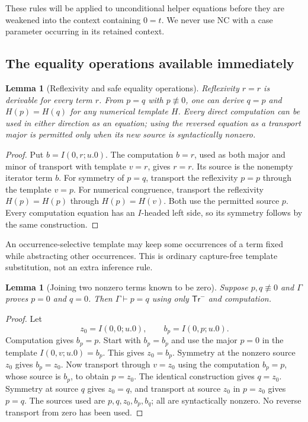\documentclass[11pt,letterpaper]{article}
\newtheorem{lemma}[theorem]{Lemma}
\theoremstyle{definition}
\begin{document}
These rules will be applied to unconditional helper equations before
they are weakened into the context containing $0=t$. We never use NC
with a case parameter occurring in its retained context.

\subsection{The equality operations available immediately}

\begin{lemma}[Reflexivity and safe equality operations]
\label{zs:safe-equality}
Reflexivity $r=r$ is derivable for every term $r$. From $p=q$ with
$p\not\equiv0$, one can derive $q=p$ and $H(p)=H(q)$ for any numerical
template $H$. Every direct computation can be used in either direction
as an equation; using the reversed equation as a transport major is
permitted only when its new source is syntactically nonzero.
\end{lemma}
\begin{proof}
Put $b=I(0,r;u.0)$. The computation $b=r$, used as both major and
minor of transport with template $v=r$, gives $r=r$. Its source is
the nonempty iterator term $b$.
For symmetry of $p=q$, transport the reflexivity $p=p$ through the
template $v=p$. For numerical congruence, transport the reflexivity
$H(p)=H(p)$ through $H(p)=H(v)$. Both use the permitted source $p$.
Every computation equation has an $I$-headed left side, so its
symmetry follows by the same construction.
\end{proof}

An occurrence-selective template may keep some occurrences of a term
fixed while abstracting other occurrences. This is ordinary
capture-free template substitution, not an extra inference rule.

\begin{lemma}[Joining two nonzero terms known to be zero]
\label{zs:zero-join}
Suppose $p,q\not\equiv0$ and $\Gamma$ proves $p=0$ and $q=0$.
Then $\Gamma\vdash p=q$ using only $\mathsf{Tr}^{-}$ and computation.
\end{lemma}
\begin{proof}
Let
\[
 z_0=I(0,0;u.0),\qquad b_p=I(0,p;u.0).
\]
Computation gives $b_p=p$. Start with $b_p=b_p$ and use the major
$p=0$ in the template $I(0,v;u.0)=b_p$. This gives $z_0=b_p$.
Symmetry at the nonzero source $z_0$ gives $b_p=z_0$.
Now transport through $v=z_0$ using the computation $b_p=p$, whose
source is $b_p$, to obtain $p=z_0$.
The identical construction gives $q=z_0$. Symmetry at source $q$
gives $z_0=q$, and transport at source $z_0$ in $p=z_0$ gives $p=q$.
The sources used are $p,q,z_0,b_p,b_q$; all are syntactically nonzero.
No reverse transport from zero has been used.
\end{proof}
\end{document}
